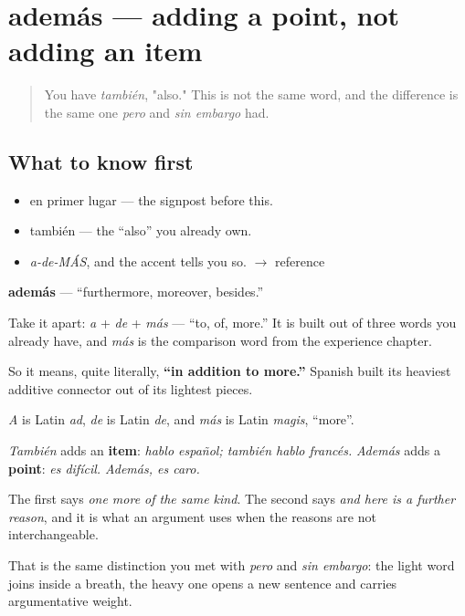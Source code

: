 \section[además]{además — adding a point, not adding an item}

\label{lesson:ES-C273-ademas}



\begin{quote}
You have \emph{también}, "also." This is not the same word, and the difference is the same one \emph{pero} and \emph{sin embargo} had.
\end{quote}

\subsection*{What to know first}
\begin{itemize}
\raggedright
  \item en primer lugar — the signpost before this.
  \item también — the \textquotedblleft{}also\textquotedblright{} you already own.
\end{itemize}

\begin{sounds}
\begin{itemize}
\raggedright
  \item \emph{a-de-MÁS}, and the accent tells you so. $\to$ reference
\end{itemize}
\end{sounds}

\begin{cousinweb}
\textbf{además} — \textquotedblleft{}furthermore, moreover, besides.\textquotedblright{}

Take it apart: \emph{a} + \emph{de} + \emph{más} — \textquotedblleft{}to, of, more.\textquotedblright{} It is built out of three words you already have, and \emph{más} is the comparison word from the experience chapter.

So it means, quite literally, \textbf{\textquotedblleft{}in addition to more.\textquotedblright{}} Spanish built its heaviest additive connector out of its lightest pieces.

\emph{A} is Latin \emph{ad}, \emph{de} is Latin \emph{de}, and \emph{más} is Latin \emph{magis}, \textquotedblleft{}more\textquotedblright{}.
\end{cousinweb}

\begin{grammarlens}[title={What you've built}]
\emph{También} adds an \textbf{item}: \emph{hablo español; también hablo francés.} \emph{Además} adds a \textbf{point}: \emph{es difícil. Además, es caro.}

The first says \emph{one more of the same kind}. The second says \emph{and here is a further reason}, and it is what an argument uses when the reasons are not interchangeable.

That is the same distinction you met with \emph{pero} and \emph{sin embargo}: the light word joins inside a breath, the heavy one opens a new sentence and carries argumentative weight.
\end{grammarlens}

